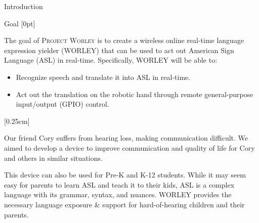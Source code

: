 \documentclass[final, 20pt]{beamer}
\newlength{\colwidth}
\begin{document}
\begin{frame}[t]
\begin{columns}[t]
\begin{column}{\colwidth}
\begin{block}{Introduction}
      \end{block}

      \begin{block}{Goal}
        [0pt]

        The goal of \textsc{Project Worley} is to create a wireless online real-time language expression yielder (WORLEY) that can be used to act out American Sign Language (ASL) in real-time. Specifically, WORLEY will be able to:

        \begin{itemize}
          \item Recognize speech and translate it into ASL in real-time.
          \item Act out the translation on the robotic hand through remote general-purpose input/output (GPIO) control.
        \end{itemize}

        [0.25cm]

        Our friend Cory suffers from hearing loss, making communication difficult. We aimed to develop a device to improve communication and quality of life for Cory and others in similar situations.

        This device can also be used for Pre-K and K-12 students.  While it may seem easy for parents to learn ASL and teach it to their kids, ASL is a complex language with its grammar, syntax, and nuances. WORLEY provides the necessary language exposure \& support for hard-of-hearing children and their parents.
      \end{block}
    \end{column}

    \separatorcolumn


\end{columns}
\end{frame}
\end{document}
